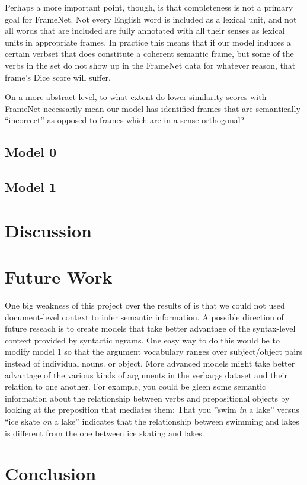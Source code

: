 \documentclass{article} %
\begin{document}
Perhaps a more important point, though, is that completeness is not a primary goal for FrameNet. Not every English word is included as a lexical unit, and not all words that are included are fully annotated with all their senses as lexical units in appropriate frames.
In practice this means that if our model induces a certain verbset that does constitute a coherent semantic frame, but some of the verbs in the set do not show up in the FrameNet data for whatever reason, that frame's Dice score will suffer.
% 




On a more abstract level, to what extent do lower similarity scores with FrameNet necessarily mean our model has identified frames that are semantically ``incorrect'' as opposed to frames which are in a sense orthogonal?







\subsection{Model 0}

\subsection{Model 1}


\section{Discussion}


\section{Future Work}
One big weakness of this project over the results of \citet{oconnor2013} is that 
we could not used document-level context to infer semantic information.
A possible direction of future reseach is to create models that take better 
advantage of the syntax-level context provided by syntactic ngrams. 
One easy way to do this would be to modify model 1 so that the argument 
vocabulary ranges over subject/object pairs instead of individual nouns.
or object.
More advanced models might take better advantage of the various kinds of arguments
in the verbargs dataset and their relation to one another.
For example, you could be gleen some semantic information about the relationship between
verbs and prepositional objects by looking at the preposition that mediates them: 
That you ''swim \emph{in} a lake'' versus ``ice skate \emph{on} a lake'' 
indicates that the relationship between swimming and lakes is different from the one between
ice skating and lakes.

\section{Conclusion}



\end{document}
